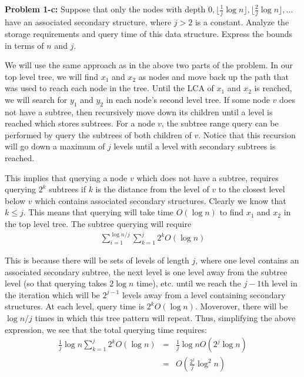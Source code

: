 \documentclass[psamsfonts]{amsart}
\newenvironment{sol}{\vspace{0.25cm}{\large \bfseries Solution:}}{\qedsymbol}
\newenvironment{prob}[1]{\begin{framed}{\large \bfseries Problem #1:}}{\end{framed}}
\begin{document}
\begin{prob}{1-c}
Suppose that only the nodes with depth $0, \lfloor \frac{1}{j} \log n \rfloor, \lfloor \frac{2}{j} \log n \rfloor, \ldots$ have an associated secondary structure, where $j > 2$ is a constant. Analyze the storage requirements and query time of this data structure. Express the bounds in terms of $n$ and $j$. 
\end{prob}
\begin{sol}
We will use the same approach as in the above two parts of the problem. In our top level tree, we will find $x_1$ and $x_2$ as nodes and move back up the path that was used to reach each node in the tree. Until the LCA of $x_1$ and $x_2$ is reached, we will search for $y_1$ and $y_2$ in each node's second level tree. If some node $v$ does not have a subtree, then recursively move down its children until a level is reached which stores subtrees. For a node $v$, the subtree range query can be performed by query the subtrees of both children of $v$. Notice that this recursion will go down a maximum of $j$ levels until a level with secondary subtrees is reached.

This implies that querying a node $v$ which does not have a subtree, requires querying $2^k$ subtrees if $k$ is the distance from the level of $v$ to the closest level below $v$ which contains associated secondary structures. Clearly we know that $k \leq j$. This means that querying will take time $O(\log n)$ to find $x_1$ and $x_2$ in the top level tree. The subtree querying will require 
\begin{eqnarray}
\sum_{i=1}^{\log n / j} \sum_{k=1}^j 2^k O(\log n)
\end{eqnarray}

This is because there will be sets of levels of length $j$, where one level contains an associated secondary subtree, the next level is one level away from the subtree level (so that querying takes $2 \log n$ time), etc. until we reach the $j-1$th level in the iteration which will be $2^{j-1}$ levels away from a level containing secondary structures. At each level, query time is $2^k O(\log n)$. Moverover, there will be $\log n/j$ times in which this tree pattern will repeat. Thus, simplifying the above expression, we see that the total querying time requires:
\begin{eqnarray}
\frac{1}{j} \log n \sum_{k=1}^j 2^k O(\log n) &=& \frac{1}{j} \log n O(2^j \log n) \\
&=& O \left( \frac{2^j}{j} \log^2 n \right)
\end{eqnarray}


\end{sol}
\end{document}
